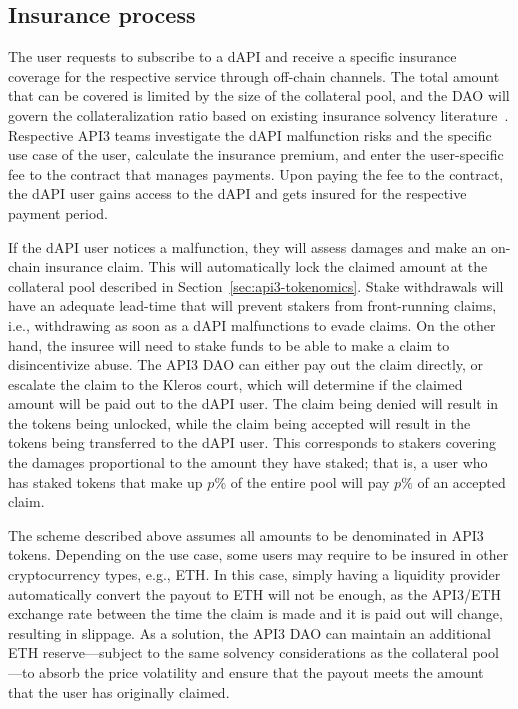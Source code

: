 \documentclass[11pt]{article}
\begin{document}
\subsection{Insurance process}
\label{sec:insurance-process}

The user requests to subscribe to a dAPI and receive a specific insurance coverage for the respective service through off-chain channels.
The total amount that can be covered is limited by the size of the collateral pool, and the DAO will govern the collateralization ratio based on existing insurance solvency literature~\cite{solvency}.
Respective API3 teams investigate the dAPI malfunction risks and the specific use case of the user, calculate the insurance premium, and enter the user-specific fee to the contract that manages payments.
Upon paying the fee to the contract, the dAPI user gains access to the dAPI and gets insured for the respective payment period.

If the dAPI user notices a malfunction, they will assess damages and make an on-chain insurance claim.
This will automatically lock the claimed amount at the collateral pool described in Section~\ref{sec:api3-tokenomics}.
Stake withdrawals will have an adequate lead-time that will prevent stakers from front-running claims, i.e., withdrawing as soon as a dAPI malfunctions to evade claims.
On the other hand, the insuree will need to stake funds to be able to make a claim to disincentivize abuse.
The API3 DAO can either pay out the claim directly, or escalate the claim to the Kleros court, which will determine if the claimed amount will be paid out to the dAPI user.
The claim being denied will result in the tokens being unlocked, while the claim being accepted will result in the tokens being transferred to the dAPI user.
This corresponds to stakers covering the damages proportional to the amount they have staked; that is, a user who has staked tokens that make up $p\%$ of the entire pool will pay $p\%$ of an accepted claim.

The scheme described above assumes all amounts to be denominated in API3 tokens.
Depending on the use case, some users may require to be insured in other cryptocurrency types, e.g., ETH.
In this case, simply having a liquidity provider automatically convert the payout to ETH will not be enough, as the API3/ETH exchange rate between the time the claim is made and it is paid out will change, resulting in slippage.
As a solution, the API3 DAO can maintain an additional ETH reserve---subject to the same solvency considerations as the collateral pool---to absorb the price volatility and ensure that the payout meets the amount that the user has originally claimed.
\end{document}
